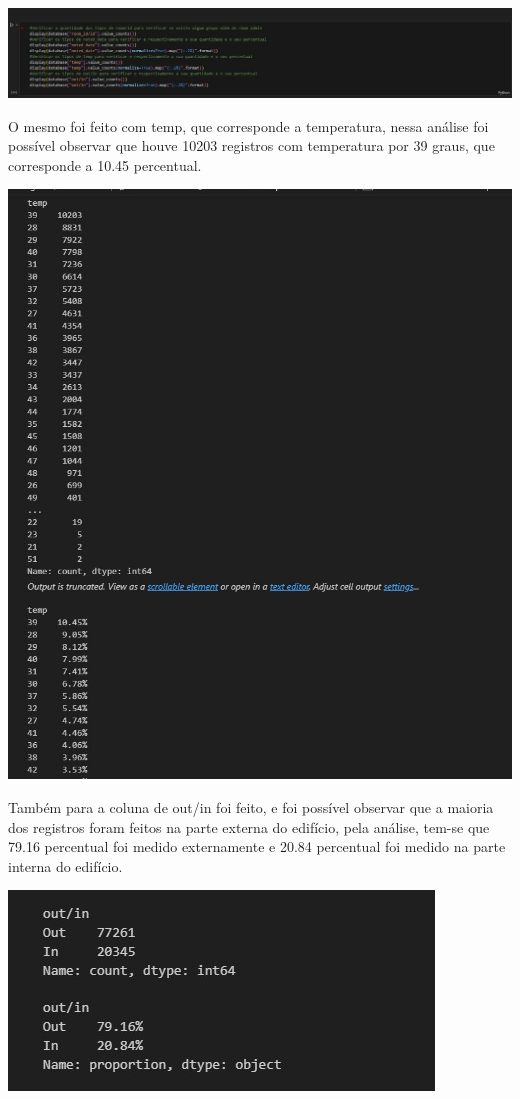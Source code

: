 \documentclass[a4paper, 12pt]{article}
\begin{document}
\includegraphics[scale=0.36]{img 03.jpg}

O mesmo foi feito com temp, que corresponde a temperatura, nessa análise foi possível observar que houve 10203 registros com temperatura por 39 graus, que corresponde a 10.45 percentual.

\includegraphics[scale=0.5]{img 05.jpg}

Também para a coluna de out/in foi feito, e foi possível observar que a maioria dos registros foram feitos na parte externa do edifício, pela análise, tem-se que 79.16 percentual foi medido externamente e 20.84 percentual foi medido na parte interna do edifício.

\includegraphics[scale=0.7]{img 06.jpg}
\end{document}
